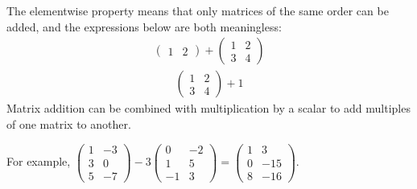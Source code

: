 \documentclass[letterpaper,10pt,english]{jupyterBook}
\begin{document}
\sphinxAtStartPar
The element\sphinxhyphen{}wise property means that only matrices of the same order can be added, and the expressions below are both meaningless:
\begin{equation*}
\begin{split} \left( \begin{matrix} 1 & 2 \end{matrix} \right) + \left( \begin{matrix} 1 & 2 \\ 3 & 4 \end{matrix} \right) \end{split}
\end{equation*}\begin{equation*}
\begin{split}\left( \begin{matrix} 1 & 2 \\ 3 & 4 \end{matrix} \right) + 1 \end{split}
\end{equation*}
\sphinxAtStartPar
Matrix addition can be combined with multiplication by a scalar to add multiples of one matrix to another.

\sphinxAtStartPar
For example, \( \left( \begin{matrix} 1 & -3 \\ 3 & 0 \\ 5 & -7 \end{matrix} \right) - 3\left( \begin{matrix} 0 & -2 \\ 1 & 5 \\ -1 & 3 \end{matrix} \right) = \left( \begin{matrix} 1 & 3 \\ 0 & -15 \\ 8 & -16 \end{matrix} \right) \).
 \label{exercise:q_matrix_arithmetic}
\end{document}

